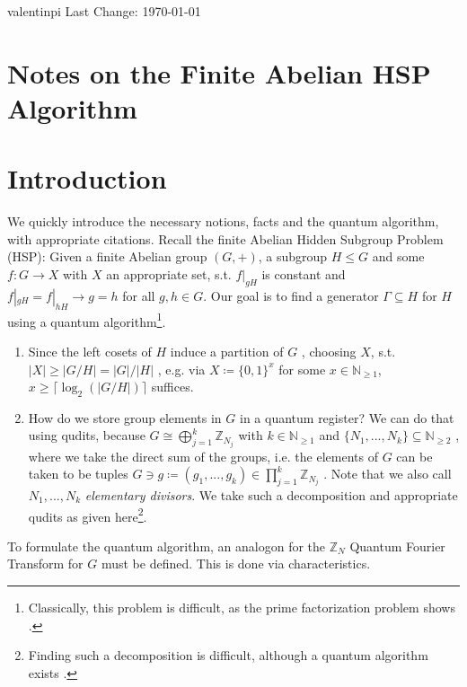 \documentclass[10pt]{amsart}
\numberwithin{equation}{section}
\theoremstyle{definition}
\theoremstyle{remark}
\begin{document}
    valentinpi \hfill Last Change: \today{}

    \section*{Notes on the Finite Abelian HSP Algorithm}

    \section{Introduction} \label{introduction}

    We quickly introduce the necessary notions, facts and the quantum algorithm, with appropriate citations. Recall the finite Abelian Hidden Subgroup Problem (HSP): Given a finite Abelian group \((G, +)\), a subgroup \(H \leq G\) and some \(f\colon G \to X\) with \(X\) an appropriate set, s.t. \(f|_{gH}\) is constant and \(f|_{gH}=f|_{hH} \rightarrow g = h\) for all \(g, h \in G\). Our goal is to find a generator \(\Gamma \subseteq H\) for \(H\) using a quantum algorithm\footnote{Classically, this problem is difficult, as the prime factorization problem shows \cite[p. 24]{Lomont}.}.

    \begin{enumerate}[label=(\roman*)]
        \item Since the left cosets of \(H\) induce a partition of \(G\) \cite[pp. 36-37]{Fischer}, choosing \(X\), s.t. \(|X| \geq |G/H| = |G|/|H|\) \cite[p. 38]{Fischer}, e.g. via \(X \coloneqq \{0, 1\}^{x}\) for some \(x \in \mathbb{N}_{\geq 1}\), \(x \geq \lceil \log_2(|G/H|) \rceil\) suffices.
        \item \label{introduction_1} How do we store group elements in \(G\) in a quantum register? We can do that using qudits, because \(G \cong \bigoplus_{j=1}^{k} \mathbb{Z}_{N_j}\) with \(k \in \mathbb{N}_{\geq 1}\) and \(\{N_1, ..., N_k\} \subseteq \mathbb{N}_{\geq 2}\) \cite[pp. 132-135]{Fischer}, where we take the direct sum of the groups, i.e. the elements of \(G\) can be taken to be tuples \(G \ni g \coloneqq (g_1,...,g_k) \in \prod_{j=1}^k \mathbb{Z}_{N_j}\) \cite[pp. 53-54]{Fischer}. Note that we also call \(N_1, ..., N_k\) \emph{elementary divisors}. We take such a decomposition and appropriate qudits as given here\footnote{Finding such a decomposition is difficult, although a quantum algorithm exists \cite[p. 17]{Lomont}.}.
    \end{enumerate}

    To formulate the quantum algorithm, an analogon for the \(\mathbb{Z}_N\) Quantum Fourier Transform for \(G\) must be defined. This is done via characteristics.
\end{document}
